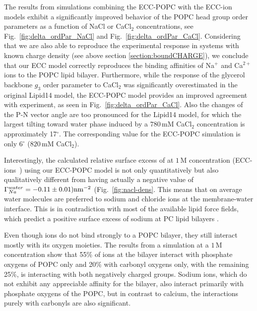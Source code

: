 The results from simulations combining the ECC-POPC with the ECC-ion models \citep{martinek17, kohagen16, Pluharova2014} exhibit a significantly improved behavior of the POPC head group order parameters as a function of NaCl or CaCl$_2$ concentrations, see Fig.~\ref{fig:delta_ordPar_NaCl} and Fig.~\ref{fig:delta_ordPar_CaCl}. Considering that we are also able to reproduce the experimental response in systems with known charge density (see above section \ref{section:boundCHARGE}), we conclude that our ECC model correctly reproduces the binding affinities of Na$^{+}$ and Ca$^{2+}$ ions to the POPC lipid bilayer. Furthermore, while the response of the glycerol backbone $g_3$ order parameter to CaCl$_2$ was significantly overestimated in the original Lipid14 model, the ECC-POPC model provides an improved agreement with experiment, as seen in Fig.~\ref{fig:delta_ordPar_CaCl}. 
Also the changes of the P-N vector angle are too pronounced for the Lipid14 model, 
for which the largest tilting toward water phase induced by a $780\,\mathrm{mM}$ 
CaCl$_2$ concentration is approximately 17$^{\circ}$. The corresponding value 
for the ECC-POPC simulation is only 6$^{\circ}$ ($820\,\mathrm{mM}$ CaCl$_2$).  

Interestingly, the calculated relative surface excess of  at $1\,\mathrm{M}$ concentration (ECC-ions~\citep{Pluharova2014}) using our ECC-POPC model is not only quantitatively but also qualitatively different from  having actually a negative value of $\Gamma_{Na}^{water} = -0.11 \pm 0.01) \rm{nm}^{-2}$ (Fig.~\ref{fig:nacl-dens}. This  
means that on average water molecules are preferred to sodium and chloride ions at the membrane-water interface.   
This is in contradiction with most of the available lipid force fields, which predict a positive surface excess of sodium at PC lipid bilayers \citep{catte16}. 
 
Even though  ions do not bind strongly to a POPC bilayer, they still interact mostly with its oxygen moieties. 
The results from a simulation at a $1\,$M  concentration show that 55\% of  ions at the bilayer interact with phosphate oxygens of POPC only and 20\% with carbonyl oxygens only, with the remaining 25\%, is interacting with both negatively charged groups. 
Sodium ions, which do not exhibit any appreciable affinity for the bilayer, also interact primarily with phosphate oxygens of the POPC, but in contrast to calcium, the interactions purely with carbonyls are also significant. 
 
